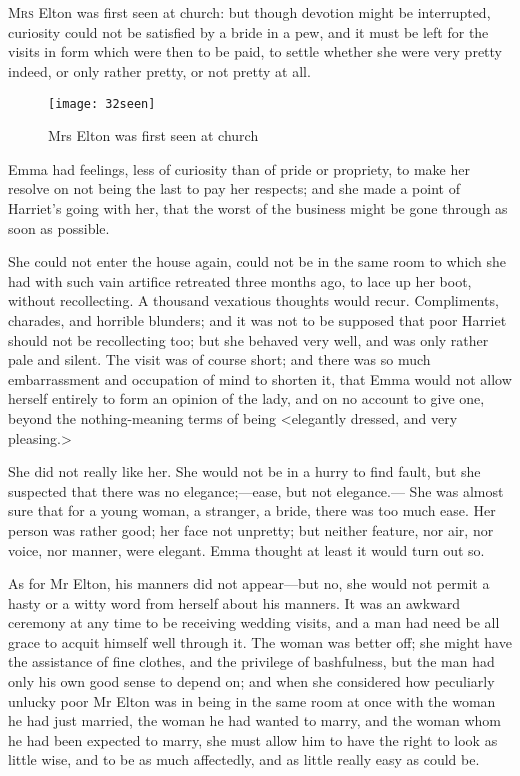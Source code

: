 \chapter[Chapter \thechapter]{}
\lettrine[lraise=0.3]{M}{rs} Elton was first seen at church: but though devotion might be interrupted, curiosity could not be satisfied by a bride in a pew, and it must be left for the visits in form which were then to be paid, to settle whether she were very pretty indeed, or only rather pretty, or not pretty at all.


\begin{figure}[tbph]
\centering
\texttt{[image: 32seen]}
\caption{Mrs Elton was first seen at church}
\end{figure}

Emma had feelings, less of curiosity than of pride or propriety, to make her resolve on not being the last to pay her respects; and she made a point of Harriet's going with her, that the worst of the business might be gone through as soon as possible.

She could not enter the house again, could not be in the same room to which she had with such vain artifice retreated three months ago, to lace up her boot, without recollecting. A thousand vexatious thoughts would recur. Compliments, charades, and horrible blunders; and it was not to be supposed that poor Harriet should not be recollecting too; but she behaved very well, and was only rather pale and silent. The visit was of course short; and there was so much embarrassment and occupation of mind to shorten it, that Emma would not allow herself entirely to form an opinion of the lady, and on no account to give one, beyond the nothing-meaning terms of being <elegantly dressed, and very pleasing.>

She did not really like her. She would not be in a hurry to find fault, but she suspected that there was no elegance;—ease, but not elegance.— She was almost sure that for a young woman, a stranger, a bride, there was too much ease. Her person was rather good; her face not unpretty; but neither feature, nor air, nor voice, nor manner, were elegant. Emma thought at least it would turn out so.

As for Mr Elton, his manners did not appear—but no, she would not permit a hasty or a witty word from herself about his manners. It was an awkward ceremony at any time to be receiving wedding visits, and a man had need be all grace to acquit himself well through it. The woman was better off; she might have the assistance of fine clothes, and the privilege of bashfulness, but the man had only his own good sense to depend on; and when she considered how peculiarly unlucky poor Mr Elton was in being in the same room at once with the woman he had just married, the woman he had wanted to marry, and the woman whom he had been expected to marry, she must allow him to have the right to look as little wise, and to be as much affectedly, and as little really easy as could be.

